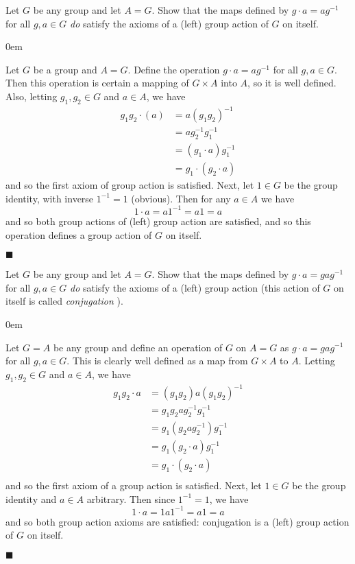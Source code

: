 \documentclass[12pt]{article}
\renewcommand{\qed}{\hfill$\blacksquare$}
\renewenvironment{proof}{\begin{addmargin}[1em]{0em}\begin{newproof}}{\end{newproof}\end{addmargin}\qed}
\newenvironment{problem}[2][Exercise]{\begin{trivlist}
\item[\hskip \labelsep {\bfseries #1}\hskip \labelsep {\bfseries #2.}]}{\end{trivlist}}
\begin{document}
\begin{problem}{1.7.15}
Let $G$ be any group and let $A=G$. Show that the maps defined by $g\cdot a=ag^{-1}$ for all $g,a\in G$ \textit{do} satisfy the axioms of a (left) group action of $G$ on itself.
\end{problem}
\begin{proof}
Let $G$ be a group and $A=G$. Define the operation $g\cdot a=ag^{-1}$ for all $g,a \in G$. Then this operation is certain a mapping of $G\times A$ into $A$, so it is well defined. Also, letting $g_1,g_2\in G$ and $a\in A$, we have
\begin{equation*}
    \begin{split}
        g_1g_2 \cdot \left(a\right) & = a\left(g_1g_2\right)^{-1} \\
        & = ag_2^{-1}g_1^{-1} \\
        & = \left(g_1\cdot a\right)g_1^{-1}\\
        & = g_1\cdot\left(g_2\cdot a\right)
    \end{split}
\end{equation*}
and so the first axiom of group action is satisfied. Next, let $1\in G$ be the group identity, with inverse $1^{-1}=1$ (obvious). Then for any $a\in A$ we have $$ 1\cdot a = a1^{-1} = a1 = a $$ and so both group actions of (left) group action are satisfied, and so this operation defines a group action of $G$ on itself.
\end{proof}


\begin{problem}{1.7.16}
Let $G$ be any group and let $A=G$. Show that the maps defined by $g\cdot a=gag^{-1}$ for all $g,a\in G$ \textit{do} satisfy the axioms of a (left) group action (this action of $G$ on itself is called \textit{conjugation}
).
\end{problem}
\begin{proof}
Let $G=A$ be any group and define an operation of $G$ on $A=G$ as $g\cdot a = gag^{-1} $ for all $g,a\in G$. This is clearly well defined as a map from $G\times A$ to $A$. Letting $g_1,g_2\in G$ and $a\in A$, we have
\begin{equation*}
    \begin{split}
        g_1g_2\cdot a & = \left(g_1g_2\right) a \left(g_1g_2\right)^{-1} \\
        & = g_1g_2ag_2^{-1}g_1^{-1} \\
        & = g_1 \left(g_2ag_2^{-1}\right)g_1^{-1} \\
        & = g_1 \left(g_2\cdot a\right) g_1^{-1} \\
        & = g_1 \cdot \left(g_2\cdot a\right) \\
    \end{split}
\end{equation*}
and so the first axiom of a group action is satisfied. Next, let $1\in G$ be the group identity and $a\in A$ arbitrary. Then since $1^{-1}=1$, we have
$$ 1\cdot a = 1a1^{-1} = a1=a $$
and so both group action axioms are satisfied: conjugation is a (left) group action of $G$ on itself.
\end{proof}
\end{document}
